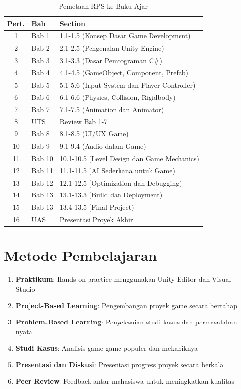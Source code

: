 \begin{table}[h]
\centering
\caption{Pemetaan RPS ke Buku Ajar}
\label{tab:pemetaan_rps_bab}
\small
\begin{tabular}{|c|l|l|}
\hline
\textbf{Pert.} & \textbf{Bab} & \textbf{Section} \\
\hline
1 & Bab 1 & 1.1-1.5 (Konsep Dasar Game Development) \\
2 & Bab 2 & 2.1-2.5 (Pengenalan Unity Engine) \\
3 & Bab 3 & 3.1-3.3 (Dasar Pemrograman C\#) \\
4 & Bab 4 & 4.1-4.5 (GameObject, Component, Prefab) \\
5 & Bab 5 & 5.1-5.6 (Input System dan Player Controller) \\
6 & Bab 6 & 6.1-6.6 (Physics, Collision, Rigidbody) \\
7 & Bab 7 & 7.1-7.5 (Animation dan Animator) \\
8 & UTS & Review Bab 1-7 \\
9 & Bab 8 & 8.1-8.5 (UI/UX Game) \\
10 & Bab 9 & 9.1-9.4 (Audio dalam Game) \\
11 & Bab 10 & 10.1-10.5 (Level Design dan Game Mechanics) \\
12 & Bab 11 & 11.1-11.5 (AI Sederhana untuk Game) \\
13 & Bab 12 & 12.1-12.5 (Optimization dan Debugging) \\
14 & Bab 13 & 13.1-13.3 (Build dan Deployment) \\
15 & Bab 13 & 13.4-13.5 (Final Project) \\
16 & UAS & Presentasi Proyek Akhir \\
\hline
\end{tabular}
\end{table}

\section{Metode Pembelajaran}

\begin{enumerate}
\item \textbf{Praktikum}: Hands-on practice menggunakan Unity Editor dan Visual Studio
\item \textbf{Project-Based Learning}: Pengembangan proyek game secara bertahap
\item \textbf{Problem-Based Learning}: Penyelesaian studi kasus dan permasalahan nyata
\item \textbf{Studi Kasus}: Analisis game-game populer dan mekaniknya
\item \textbf{Presentasi dan Diskusi}: Presentasi progress proyek secara berkala
\item \textbf{Peer Review}: Feedback antar mahasiswa untuk meningkatkan kualitas
\end{enumerate}

